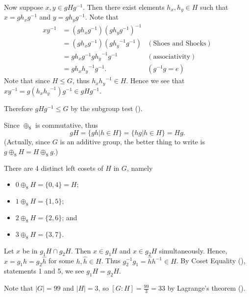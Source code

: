 \begin{questions}
    Now suppose $x, y \in gHg^{-1}$. Then there exist elements $h_x, h_y \in H$ such that $x = gh_xg^{-1}$ and $y = gh_yg^{-1}$. Note that
    \begin{align*}
        xy^{-1} &= (gh_xg^{-1})(gh_yg^{-1})^{-1}\\
        &= (gh_xg^{-1})(g{h_y}^{-1}g^{-1}) & (\text{Shoes and Shocks})\\
        &= gh_xg^{-1}g{h_y}^{-1}g^{-1} & (\text{associativity})\\
        &= gh_x{h_y}^{-1}g^{-1}. & (g^{-1}g = e)
    \end{align*}
    Note that since $H \leq G$, thus $h_x{h_y}^{-1} \in H$. Hence we see that $xy^{-1} = g(h_x{h_y}^{-1})g^{-1} \in gHg^{-1}$.

    Therefore $gHg^{-1} \leq G$ by the subgroup test ().

    \item \begin{partquestions}{\alph*}
        \item Since $\oplus_8$ is commutative, thus
        \[
            gH = \{gh \vert h \in H\} = \{hg \vert h \in H\} = Hg.
        \]
        (Actually, since $G$ is an additive group, the better thing to write is $g \oplus_8 H = H \oplus_8 g$.)

        \item There are 4 distinct left cosets of $H$ in $G$, namely
        \begin{itemize}
            \item $0 \oplus_8 H = \{0, 4\} = H$;
            \item $1 \oplus_8 H = \{1, 5\}$;
            \item $2 \oplus_8 H = \{2, 6\}$; and
            \item $3 \oplus_8 H = \{3, 7\}$.
        \end{itemize}
    \end{partquestions}

    \item Let $x$ be in $g_1H \cap g_2H$. Then $x \in g_1H$ and $x \in g_2H$ simultaneously. Hence, $x = g_1h = g_2\hat{h}$ for some $h, \hat{h} \in H$. Thus $g_2^{-1}g_1 = \hat{h}h^{-1} \in H$. By Coset Equality (), statements 1 and 5, we see $g_1H = g_2H$.

    \item Note that $|G| = 99$ and $|H| = 3$, so $[G:H] = \frac{99}{3} = 33$ by Lagrange's theorem ().


\end{questions}

